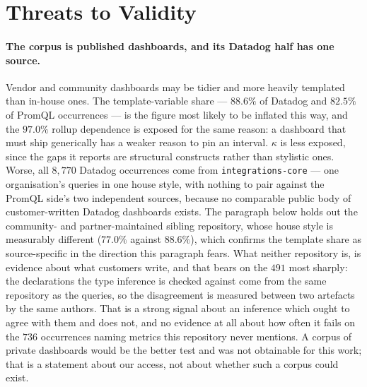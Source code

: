 
\section{Threats to Validity}
\label{s2:sec:threats}

\paragraph{The corpus is published dashboards, and its Datadog half has one source.}
Vendor and community dashboards may be tidier and more heavily templated than in-house
ones. The template-variable share --- $88.6\%$ of Datadog and $82.5\%$ of PromQL
occurrences --- is the figure most likely to be inflated this way, and the $97.0\%$ rollup
dependence is exposed for the same reason: a dashboard that must ship generically has a
weaker reason to pin an interval. $\kappa$ is less exposed, since the gaps it reports are
structural constructs rather than stylistic ones. Worse, all $8{,}770$ Datadog occurrences
come from \texttt{integrations-core} --- one organisation's queries in one house style,
with nothing to pair against the PromQL side's two independent sources, because no
comparable public body of customer-written Datadog dashboards exists.
The paragraph below holds out the community- and partner-maintained sibling repository,
whose house style is measurably different ($77.0\%$ against $88.6\%$), which confirms the
template share as source-specific in the direction this paragraph fears. What neither
repository is, is evidence about what customers write, and that bears on the $491$ most
sharply: the declarations the type inference is checked against come from the same
repository as the queries, so the disagreement is measured between two artefacts by the
same authors. That is a strong signal about an inference which ought to agree with them and
does not, and no evidence at all about how often it fails on the $736$ occurrences naming
metrics this repository never mentions. A corpus of private dashboards would be the better
test and was not obtainable for this work; that is a statement about our access, not about
whether such a corpus could exist.

